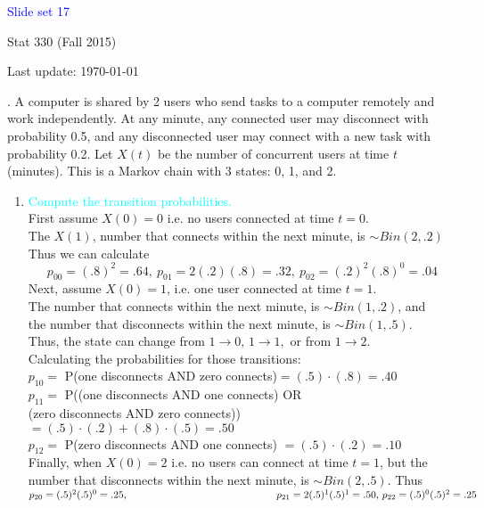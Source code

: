 \documentclass[20pt,landscape]{foils}
\newcommand{\no}{\noindent}
\newcommand{\bul}{\hspace*{.3in}{\textcolor{red}{$\bullet$ \ }}}
\begin{document}
\LogoOff

\foilhead[1.3in]{}
\centerline{\LARGE \textcolor{blue}{Slide set 17}}
\vspace{0.3in}
\centerline{\large Stat 330 (Fall 2015)}
\vspace{0.2in}
\centerline{\tiny Last update: \today}
\setcounter{page}{0}


\foilhead[-.8in]{\textcolor{blue}{Example 6.9 (Baron)}}
\no {\textcolor{magenta}{Shared Device}}. A computer is shared by 2 users who send
tasks to a computer remotely and work independently. At any minute,
any connected user may disconnect with probability 0.5, and any disconnected
user may connect with a new task with probability 0.2. Let $X(t)$
be the number of concurrent users at time $t$ (minutes). This is
a Markov chain with 3 states: 0, 1, and 2. 
\begin{enumerate}
\item {\textcolor{cyan}{Compute the transition probabilities.}}\\[.1in]
First assume $X(0)=0$ i.e. no users connected at time $t=0$.\\[.1in]
The $X(1)$, number that connects within the next minute, is $\sim Bin(2,.2)$\\[.1in]
Thus we can calculate 
$$p_{00}= (.8)^2=.64,\ p_{01}= 2(.2)(.8)=.32,\  p_{02}= (.2)^2(.8)^0=.04$$
Next, assume $X(0)=1$, i.e. one user connected at time $t=1$.\\[.1in]
The number that connects within the next minute, is $\sim Bin(1,.2)$, and\\
 the number that disconnects within the next minute, is $\sim Bin(1,.5)$.\\[.1in]
Thus, the state can change from $1 \rightarrow 0,\,1 \rightarrow 1,$ or from $1 \rightarrow 2$.\\
Calculating the probabilities for those transitions:\\[.1in]
\bul $p_{10}= $ P(one disconnects AND zero connects)$=(.5) \cdot (.8)=.40$\\[.1in]
\bul $p_{11}= $ P((one disconnects AND one connects) OR \\
\hspace*{3in}(zero disconnects AND zero connects))\\
\hspace*{3in} $=(.5)\cdot (.2) + (.8)\cdot (.5)=.50 $\\[.1in]
\bul $p_{12}= $ P(zero disconnects AND one connects) $=(.5)\cdot (.2) =.10 $\\[.1in]
Finally, when $X(0)=2$ i.e. no users can  connect at time $t=1$, but the number that disconnects within the next minute, is $\sim Bin(2,.5)$.
Thus \\[.1in]
\bul $p_{20}= (.5)^2(.5)^0=.25,\\
\hspace*{2in} \,p_{21}= 2(.5)^1(.5)^1=.50,\,p_{22}= (.5)^0(.5)^2=.25$ 


\end{enumerate}
\end{document}
